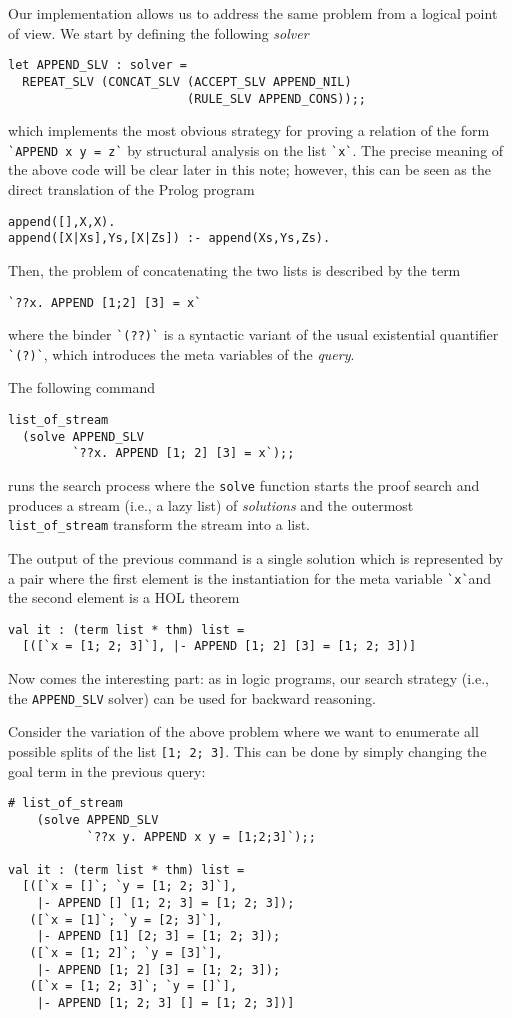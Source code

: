 Our implementation allows us to address the same problem from a
logical point of view.  We start by defining the following
\emph{solver}
\begin{verbatim}
let APPEND_SLV : solver =
  REPEAT_SLV (CONCAT_SLV (ACCEPT_SLV APPEND_NIL)
                         (RULE_SLV APPEND_CONS));;
\end{verbatim}
which implements the most obvious strategy for proving a relation of
the form \verb|`APPEND x y = z`| by structural analysis on the list
\verb|`x`|.  The precise meaning of the above code will be clear later
in this note; however, this can be seen as the direct translation of
the Prolog program
\begin{verbatim}
append([],X,X).
append([X|Xs],Ys,[X|Zs]) :- append(Xs,Ys,Zs).
\end{verbatim}

Then, the problem of concatenating the two lists is described by the
term
\begin{verbatim}
`??x. APPEND [1;2] [3] = x`
\end{verbatim}
where the binder \verb|`(??)`| is a syntactic variant of the usual
existential quantifier \verb|`(?)`|, which introduces the meta
variables of the \emph{query}.

The following command
\begin{verbatim}
list_of_stream
  (solve APPEND_SLV
         `??x. APPEND [1; 2] [3] = x`);;
\end{verbatim}
runs the search process where the \verb|solve| function starts the
proof search and produces a stream (i.e., a lazy list) of
\emph{solutions} and the outermost \verb|list_of_stream| transform the
stream into a list.

The output of the previous command is a single solution which is
represented by a pair where the first element is the instantiation for
the meta variable \verb|`x`|and the second element is a HOL theorem
\begin{verbatim}
val it : (term list * thm) list =
  [([`x = [1; 2; 3]`], |- APPEND [1; 2] [3] = [1; 2; 3])]
\end{verbatim}

Now comes the interesting part: as in logic programs, our search
strategy (i.e., the \verb|APPEND_SLV| solver) can be used for backward
reasoning.

Consider the variation of the above problem where we want to enumerate
all possible splits of the list \verb|[1; 2; 3]|.  This can be done by
simply changing the goal term in the previous query:
\begin{verbatim}
# list_of_stream
    (solve APPEND_SLV
           `??x y. APPEND x y = [1;2;3]`);;

val it : (term list * thm) list =
  [([`x = []`; `y = [1; 2; 3]`],
    |- APPEND [] [1; 2; 3] = [1; 2; 3]);
   ([`x = [1]`; `y = [2; 3]`],
    |- APPEND [1] [2; 3] = [1; 2; 3]);
   ([`x = [1; 2]`; `y = [3]`],
    |- APPEND [1; 2] [3] = [1; 2; 3]);
   ([`x = [1; 2; 3]`; `y = []`],
    |- APPEND [1; 2; 3] [] = [1; 2; 3])]
\end{verbatim}

